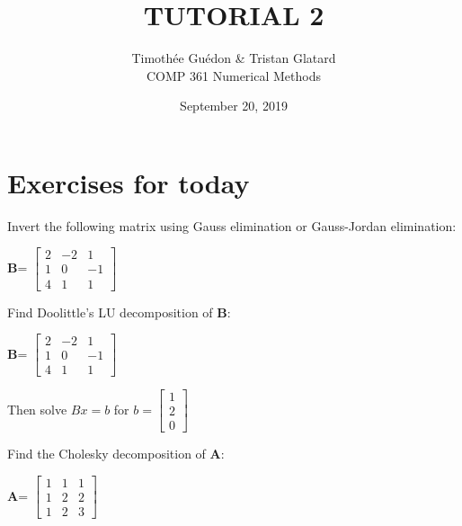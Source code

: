 \documentclass[12pt]{article}
\newenvironment{exercise}[2][Exercise]{\begin{trivlist}
\item[\hskip \labelsep {\bfseries #1}\hskip \labelsep {\bfseries #2.}]}{\end{trivlist}}
\begin{document}
\title{TUTORIAL 2}
\author{Timothée Guédon \& Tristan Glatard\\
COMP 361 Numerical Methods}
\date{September 20, 2019}
\maketitle

\section{Exercises for today}

\begin{exercise}{1}
Invert the following matrix using Gauss elimination or Gauss-Jordan elimination:
\begin{center}
\textbf{B}=
$
\begin{bmatrix}
2 & -2 & 1 \\
1 & 0 & -1 \\
4 & 1 & 1
\end{bmatrix}
$
\end{center}
\end{exercise}

\begin{exercise}{2}
Find Doolittle's LU decomposition of \textbf{B}:\\
\begin{center}
\textbf{B}=
$
\begin{bmatrix}
2 & -2 & 1 \\
1 & 0 & -1 \\
4 & 1 & 1
\end{bmatrix}$
\end{center}
Then solve $Bx=b$ for $b = \begin{bmatrix}
  1 \\ 2 \\ 0
\end{bmatrix}$
\end{exercise}

\begin{exercise}{3}
Find the Cholesky decomposition of \textbf{A}: \\
\begin{center}
\textbf{A}=
$
\begin{bmatrix}
1 & 1 & 1 \\
1 & 2 & 2 \\
1 & 2 & 3
\end{bmatrix}
$
\end{center}
\end{exercise}
\end{document}
